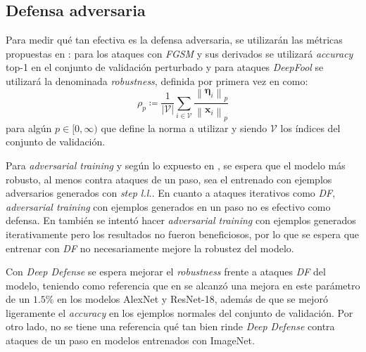 \documentclass[conference]{IEEEtran}
\newcommand{\norm}[1]{\left\lVert#1\right\rVert}
\begin{document}
\subsection{Defensa adversaria}
Para medir qué tan efectiva es la defensa adversaria, se utilizarán las métricas propuestas en \cite{deepdefense}: para los ataques con \textit{FGSM} y sus derivados se utilizará \textit{accuracy} top-1 en el conjunto de validación perturbado y para ataques \textit{DeepFool} se utilizará la denominada \textit{robustness}, definida por primera vez en \cite{deepfool} como:
\begin{equation}
\rho_p \coloneqq \frac{1}{|\mathcal{V}|} \sum_{i \in \mathcal{V}} \frac{\norm{\bm{\eta}_i}_p}{\norm{\bm{x}_i}_p}
\end{equation}
para algún $p\in [0, \infty)$ que define la norma a utilizar y siendo $\mathcal{V}$ los índices del conjunto de validación. 

Para \textit{adversarial training} y según lo expuesto en \cite{kurakin2016}, se espera que el modelo más robusto, al menos contra ataques de un paso, sea el entrenado con ejemplos adversarios generados con \textit{step l.l.}. En cuanto a ataques iterativos como \textit{DF}, \textit{adversarial training} con ejemplos generados en un paso no es efectivo como defensa. En \cite{kurakin2016} también se intentó hacer \textit{adversarial training} con ejemplos generados iterativamente pero los resultados no fueron beneficiosos, por lo que se espera que entrenar con \textit{DF} no necesariamente mejore la robustez del modelo.

Con \textit{Deep Defense} se espera mejorar el \textit{robustness} frente a ataques \textit{DF} del modelo, teniendo como referencia que en \cite{deepdefense} se alcanzó una mejora en este parámetro de un $1.5\%$ en los modelos AlexNet y ResNet-18, además de que se mejoró ligeramente el \textit{accuracy} en los ejemplos normales del conjunto de validación. Por otro lado, no se tiene una referencia qué tan bien rinde \textit{Deep Defense} contra ataques de un paso en modelos entrenados con ImageNet.

\end{document}
